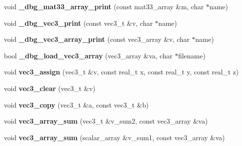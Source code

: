 \begin{DoxyCompactItemize}
\item 
void {\bfseries \+\_\+dbg\+\_\+mat33\+\_\+array\+\_\+print} (const mat33\+\_\+array \&m, char $\ast$name)\hypertarget{namespacekukadu_a4e104bf40327924e202b4c6a90db429c}{}\label{namespacekukadu_a4e104bf40327924e202b4c6a90db429c}

\item 
void {\bfseries \+\_\+dbg\+\_\+vec3\+\_\+print} (const vec3\+\_\+t \&v, char $\ast$name)\hypertarget{namespacekukadu_ae338e6e83d44ab2661c0228a976bab39}{}\label{namespacekukadu_ae338e6e83d44ab2661c0228a976bab39}

\item 
void {\bfseries \+\_\+dbg\+\_\+vec3\+\_\+array\+\_\+print} (const vec3\+\_\+array \&v, char $\ast$name)\hypertarget{namespacekukadu_a81f4b094f08335b2dbea60c5ec663879}{}\label{namespacekukadu_a81f4b094f08335b2dbea60c5ec663879}

\item 
bool {\bfseries \+\_\+dbg\+\_\+load\+\_\+vec3\+\_\+array} (vec3\+\_\+array \&va, char $\ast$filename)\hypertarget{namespacekukadu_acc37823633788b4a27da24afbbdf5f2f}{}\label{namespacekukadu_acc37823633788b4a27da24afbbdf5f2f}

\item 
void {\bfseries vec3\+\_\+assign} (vec3\+\_\+t \&v, const real\+\_\+t x, const real\+\_\+t y, const real\+\_\+t z)\hypertarget{namespacekukadu_ad1a207a76e4bf4a178ec1bf40c76eae9}{}\label{namespacekukadu_ad1a207a76e4bf4a178ec1bf40c76eae9}

\item 
void {\bfseries vec3\+\_\+clear} (vec3\+\_\+t \&v)\hypertarget{namespacekukadu_a64cc2fd0b9dca61f132622396555883e}{}\label{namespacekukadu_a64cc2fd0b9dca61f132622396555883e}

\item 
void {\bfseries vec3\+\_\+copy} (vec3\+\_\+t \&a, const vec3\+\_\+t \&b)\hypertarget{namespacekukadu_a1816336e1b370091d15662f7795f65a4}{}\label{namespacekukadu_a1816336e1b370091d15662f7795f65a4}

\item 
void {\bfseries vec3\+\_\+array\+\_\+sum} (vec3\+\_\+t \&v\+\_\+sum2, const vec3\+\_\+array \&va)\hypertarget{namespacekukadu_a032ed850a38237b3f35574149ff7110e}{}\label{namespacekukadu_a032ed850a38237b3f35574149ff7110e}

\item 
void {\bfseries vec3\+\_\+array\+\_\+sum} (scalar\+\_\+array \&v\+\_\+sum1, const vec3\+\_\+array \&va)\hypertarget{namespacekukadu_a1c605033326376c59199ef3b4f432472}{}\label{namespacekukadu_a1c605033326376c59199ef3b4f432472}


\end{DoxyCompactItemize}
